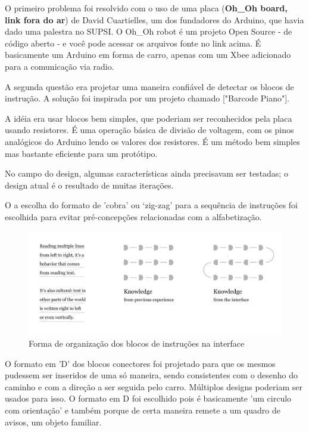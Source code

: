 \documentclass[paper=a4, fontsize=11pt]{scrartcl} %
\numberwithin{equation}{section} %
\numberwithin{figure}{section} %
\numberwithin{table}{section} %
\begin{document}
O primeiro problema foi resolvido com o uso de uma placa (\textbf{Oh\_Oh board, link fora do ar}) de  David Cuartielles, um dos fundadores do Arduino, que havia dado uma palestra no SUPSI. O Oh\_Oh robot é um projeto Open Source - de código aberto - e você pode acessar os arquivos fonte no link acima. É basicamente um Arduino em forma de carro, apenas com um Xbee adicionado para a comunicação via radio.

A segunda questão era projetar uma maneira confiável de detectar os blocos de instrução. A solução foi inspirada por um projeto chamado ["Barcode Piano"].

A idéia era usar blocos bem simples, que poderiam ser reconhecidos pela placa usando resistores. É uma operação básica de divisão de voltagem, com os pinos analógicos do Arduino lendo os valores dos resistores. É um método bem simples mas bastante eficiente para um protótipo.

No campo do design, algumas características ainda precisavam ser testadas; o design atual é o resultado de muitas iterações.

O a escolha do formato de 'cobra' ou ‘zig-zag' para a sequência de instruções foi escolhida para evitar pré-concepções relacionadas com a alfabetização.  

\begin{figure}[htb] %
\centering
\includegraphics[scale=0.25]{./imagens/left-to-right.jpg}
\caption[ ]{Forma de organização dos blocos de instruções na interface}
\end{figure}

 
 O formato em 'D' dos blocos conectores foi projetado para que os mesmos pudessem ser inseridos de uma só maneira, sendo consistentes com o desenho do caminho e com a direção a ser seguida pelo carro. Múltiplos designs poderiam ser usados para isso. O formato em D foi escolhido pois é basicamente 'um circulo com orientação' e também porque de certa maneira remete a um quadro de avisos, um objeto familiar.
 
\end{document}
